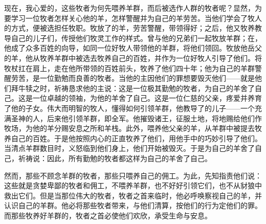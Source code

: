 现在，我心爱的，这些牧者为何先喂养羊群，而后被选作人群的牧者呢？显然，为要学习一位牧者怎样关心他的羊，怎样警醒并为自己的羊劳苦。当他们学会了牧人的方式，便被选担任牧职。牧放了的羊，劳苦警醒，带领得好；之后，他又牧养教导自己的儿子们，传授他们牧灵工作的样式。曾与他的兄弟们一起牧放羊群；在，他成了众多百姓的向导，如同一位好牧人带领他的羊群，将他们领回。牧放他岳父的羊，他从牧养羊群中被选去牧养自己的百姓，并作为一位好牧人引导了他们。将牧杖扛在肩上，走在他所带领的百姓前头，牧养了他们四十年；他为自己的羊群警醒劳苦，是一位勤勉而良善的牧者。当他的主因他们的罪想要毁灭他们——就是他们拜牛犊之时，祈祷恳求他的主说：这是一位极其勤勉的牧者，为自己的羊舍了自己。这是一位卓越的领袖，为他的羊舍了自己。这是一位仁慈的父亲，疼爱并养育了他的子女。伟大而明智的牧人，懂得如何引领羊群，他教导了的儿子——一个充满圣神的人，后来他引领羊群，即全军。他摧毁诸王，征服土地，将地赐给他们作牧场，为他的羊分赐安息之所和羊栈。此外，喂养他父亲的羊，从羊群中被提去牧养自己的百姓。于是他按照内心的正直牧养了他们，用他手中的巧妙引导了他们。当清点羊群数目时，义怒临到他们身上，他们开始被毁灭。于是为自己的羊舍了自己，祈祷说：因此，所有勤勉的牧者都这样为自己的羊舍了自己。\par

然而，那些不顾念羊群的牧者，那些只喂养自己的佣工。为此，先知指责他们说：这些就是贪婪卑鄙的牧者和佣工，不喂养羊群，也不好好引领它们，也不从豺狼中救出它们。但是当那位伟大的牧者，牧者之首来临时，他必呼唤察视自己的羊，并认识自己的羊群。他必将那些牧者带来，与他们清算，按他们的行为定他们的罪。而那些牧养好羊群的，牧者之首必使他们欢欣，承受生命与安息。\par

